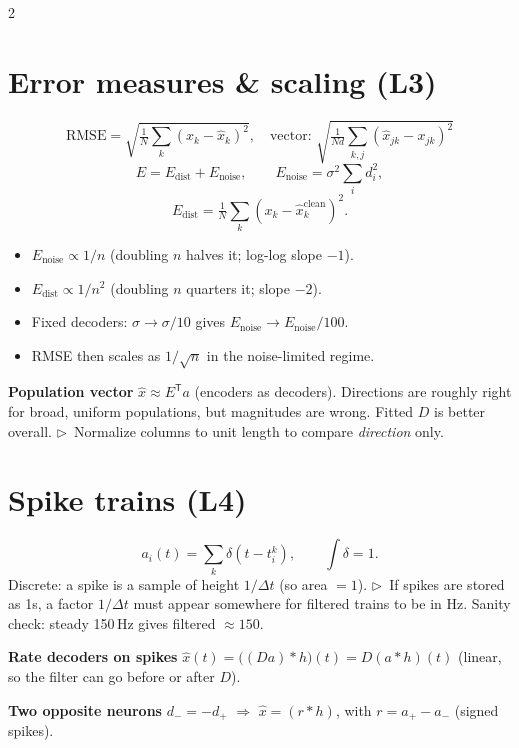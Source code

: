 \documentclass[9pt,letterpaper]{extarticle}
\newcommand{\sub}[1]{\par\vspace{2pt}\textbf{#1}\quad}
\newcommand{\tip}[1]{{\color{BrickRed}\small$\triangleright$~#1}}
\newcommand{\T}{\mathsf{T}}
\begin{document}
\begin{multicols}{2}
\section{Error measures \& scaling (L3)}
\[
\text{RMSE} = \sqrt{\tfrac1N\textstyle\sum_k (x_k - \hat x_k)^2},\quad \text{vector: } \sqrt{\tfrac{1}{Nd}\textstyle\sum_{k,j}(\hat x_{jk} - x_{jk})^2}
\]
\[
E = E_{\mathrm{dist}} + E_{\mathrm{noise}},\qquad E_{\mathrm{noise}} = \sigma^2\textstyle\sum_i d_i^2,
\]
\[
E_{\mathrm{dist}} = \tfrac1N\textstyle\sum_k (x_k - \hat x_k^{\mathrm{clean}})^2.
\]
\begin{itemize}
\item $E_{\mathrm{noise}} \propto 1/n$ (doubling $n$ halves it; log-log slope $-1$).
\item $E_{\mathrm{dist}} \propto 1/n^2$ (doubling $n$ quarters it; slope $-2$).
\item Fixed decoders: $\sigma \to \sigma/10$ gives $E_{\mathrm{noise}} \to E_{\mathrm{noise}}/100$.
\item RMSE then scales as $1/\sqrt n$ in the noise-limited regime.
\end{itemize}
\sub{Population vector} $\hat x \approx E^\T a$ (encoders as decoders). Directions are roughly right for broad, uniform populations, but magnitudes are wrong. Fitted $D$ is better overall.
\tip{Normalize columns to unit length to compare \emph{direction} only.}

\section{Spike trains (L4)}
\[
a_i(t) = \textstyle\sum_k \delta(t - t_i^k),\qquad \int\delta = 1.
\]
Discrete: a spike is a sample of height $1/\Delta t$ (so area $= 1$).
\tip{If spikes are stored as 1s, a factor $1/\Delta t$ must appear somewhere for filtered trains to be in Hz. Sanity check: steady 150\,Hz gives filtered $\approx 150$.}
\sub{Rate decoders on spikes} $\hat x(t) = \big((D a) * h\big)(t) = D(a * h)(t)$ (linear, so the filter can go before or after $D$).
\sub{Two opposite neurons} $d_- = -d_+$ $\Rightarrow$ $\hat x = (r * h)$, with $r = a_+ - a_-$ (signed spikes).


\end{multicols}
\end{document}
